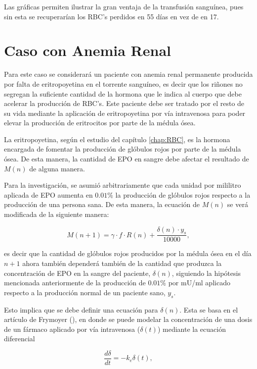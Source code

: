 Las gráficas permiten ilustrar la gran ventaja de la transfusión sanguínea, pues sin esta se recuperarían los RBC's perdidos en 55 días en vez de en 17.

\section{Caso con Anemia Renal}\label{Sec:variaciones:anemia}

Para este caso se considerará un paciente con anemia renal permanente producida por falta de eritropoyetina en el torrente sanguíneo, es decir que los riñones no segregan la suficiente cantidad de la hormona que le indica al cuerpo que debe acelerar la producción de RBC's. Este paciente debe ser tratado por el resto de su vida mediante la aplicación de eritropoyetina por vía intravenosa para poder elevar la producción de eritrocitos por parte de la médula ósea. 

La eritropoyetina, según el estudio del capítulo \ref{chap:RBC}, es la hormona encargada de fomentar la producción de glóbulos rojos por parte de la médula ósea. De esta manera, la cantidad de EPO en sangre debe afectar el resultado de $M(n)$ de alguna manera.

Para la investigación, se asumió arbitrariamente que cada unidad por mililitro aplicada de EPO aumenta en $0.01\%$ la producción de glóbulos rojos respecto a la producción de una persona sana. De esta manera, la ecuación de $M(n)$ se verá modificada de la siguiente manera: 

\begin{equation*}
    M(n+1)=\gamma\cdot f \cdot R(n)+\frac{\delta(n)\cdot y_s}{10000},
\end{equation*}

es decir que la cantidad de glóbulos rojos producidos por la médula ósea en el día $n+1$ ahora también dependerá también de la cantidad que produzca la concentración de EPO en la sangre del paciente, $\delta(n)$, siguiendo la hipótesis mencionada anteriormente de la producción de $0.01\%$ por mU/ml aplicado respecto a la producción normal de un paciente sano, $y_s$. 

Esto implica que se debe definir una ecuación para $\delta(n)$. Esta se basa en el artículo de Frymoyer (\cite{FRYMOYER2019123}), en donde se puede modelar la concentración de una dosis de un fármaco aplicado por vía intravenosa ($\delta(t)$) mediante la ecuación diferencial

\begin{equation}\label{eq:diferencial}
    \dfrac{d\delta}{dt}=-k_e \delta(t),
\end{equation}

